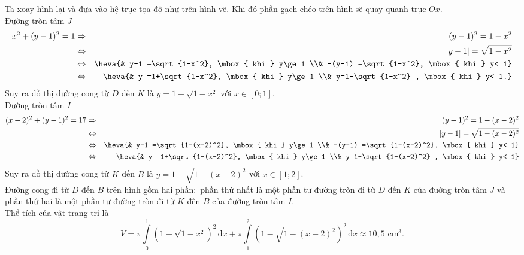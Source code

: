 \begin{ex}
{\begin{center}
		\end{center}
		Ta xoay hình lại và đưa vào hệ trục tọa độ như trên hình vẽ. Khi đó phần gạch chéo trên hình sẽ quay quanh trục $Ox$.\\
		Đường tròn tâm $J$
		\allowdisplaybreaks
		\begin{eqnarray*}
			x^2+(y-1)^2=1&\Rightarrow& (y-1)^2=1-x^2\\
			& \Leftrightarrow& |y-1|=\sqrt{1-x^2}\\
			& \Leftrightarrow &\heva{& y-1 =\sqrt{1-x^2}, \mbox{ khi } y\ge 1 \\& -(y-1) =\sqrt{1-x^2}, \mbox{ khi } y< 1} \\
			&\Leftrightarrow& \heva{& y =1+\sqrt{1-x^2}, \mbox{ khi } y\ge 1 \\& y=1-\sqrt{1-x^2} , \mbox{ khi } y< 1.}
		\end{eqnarray*}	
		Suy ra đồ thị đường cong từ $D$ đến $K$ là $y=1+\sqrt{1-x^2}$ với $x\in [0;1]$.\\	
		Đường tròn tâm $I$
		\begin{eqnarray*}
			(x-2)^2+(y-1)^2=17&\Rightarrow& (y-1)^2=1-(x-2)^2 \\
			&\Leftrightarrow& |y-1|=\sqrt{1-(x-2)^2}\\
			&\Leftrightarrow& \heva{& y-1 =\sqrt{1-(x-2)^2}, \mbox{ khi } y\ge 1 \\& -(y-1) =\sqrt{1-(x-2)^2}, \mbox{ khi } y< 1}\\
			&\Leftrightarrow& \heva{& y =1+\sqrt{1-(x-2)^2}, \mbox{ khi } y\ge 1 \\& y=1-\sqrt{1-(x-2)^2} , \mbox{ khi } y< 1}
		\end{eqnarray*}
		Suy ra đồ thị đường cong từ $K$ đến $B$ là $y=1-\sqrt{1-(x-2)^2}$ với $x\in [1;2]$.\\	
		Đường cong đi từ $D$ đến $B$ trên hình gồm hai phần$\colon$ phần thứ nhất là một phần tư đường tròn đi từ $D$ đến $K$ của đường tròn tâm $J$ và phần thứ hai là một phần tư đường tròn đi từ $K$ đến $B$ của đường tròn tâm $I$.\\
		Thể tích của vật trang trí là
		$$V= \pi\displaystyle\int\limits_0^1 \left(1+\sqrt{1-x^2}\right)^2\mathrm{\,d}x +  \pi\displaystyle\int\limits_1^2 \left(1-\sqrt{1-(x-2)^2}\right)^2\mathrm{\,d}x \approx 10{,}5 \mbox{ cm}^3.$$
	}
\end{ex}

